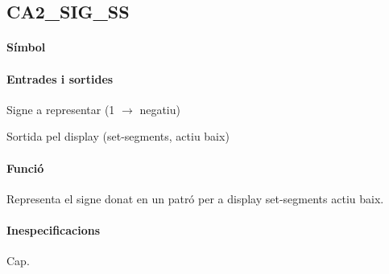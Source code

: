 \subsection{\label{sub:\projectname-CA2_SIG_SS} \textsf{CA2\_SIG\_SS}}

\paragraph{Símbol}

\begin{center}  \end{center}

\paragraph{Entrades i sortides}

\begin{where}
\item[\nodenamebit{sig}] Signe a representar (1 $\rightarrow$ negatiu)
\item[\nodenamerange{ss}{6}{0}] Sortida pel display (set-segments, actiu baix)
\end{where}

\paragraph{Funció}

Representa el signe donat en un patró per a display set-segments actiu baix.

\paragraph{Inespecificacions}

Cap.

\vspace{1cm}
